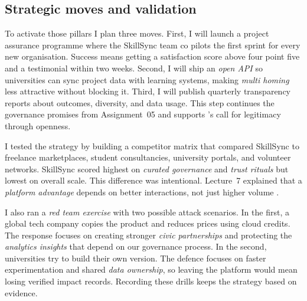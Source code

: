 \subsection*{Strategic moves and validation}
To activate those pillars I plan three moves. First, I will launch a project assurance programme where the SkillSync team co pilots the first sprint for every new organisation. Success means getting a satisfaction score above four point five and a testimonial within two weeks. Second, I will ship an \textit{open API} so universities can sync project data with learning systems, making \textit{multi homing} less attractive without blocking it. Third, I will publish quarterly transparency reports about outcomes, diversity, and data usage. This step continues the governance promises from Assignment~05 and supports \citet{Srnicek2017}'s call for legitimacy through openness.

I tested the strategy by building a competitor matrix that compared SkillSync to freelance marketplaces, student consultancies, university portals, and volunteer networks. SkillSync scored highest on \textit{curated governance} and \textit{trust rituals} but lowest on overall scale. This difference was intentional. Lecture~7 explained that a \textit{platform advantage} depends on better interactions, not just higher volume \citep{Lecture07}.  

I also ran a \textit{red team exercise} with two possible attack scenarios. In the first, a global tech company copies the product and reduces prices using cloud credits. The response focuses on creating stronger \textit{civic partnerships} and protecting the \textit{analytics insights} that depend on our governance process. In the second, universities try to build their own version. The defence focuses on faster experimentation and shared \textit{data ownership}, so leaving the platform would mean losing verified impact records. Recording these drills keeps the strategy based on evidence.